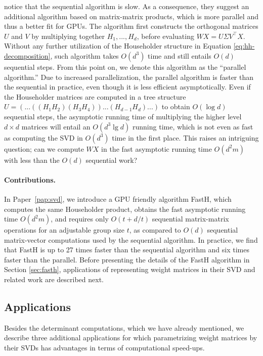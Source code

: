 \documentclass[11pt,a4paper,twoside,openright,final]{memoir}
\newcommand*{\paperref}[1]{Paper~\hyperref[#1]{\ref{#1}}}
\begin{document}
\citet{sequential} notice that the sequential algorithm is slow. 
As a consequence, they suggest an additional algorithm based on matrix-matrix products, which is more parallel and thus a better fit for GPUs. 
The algorithm first constructs the orthogonal matrices $U$ and $V$ by multiplying together $H_1, ..., H_d$, before evaluating $WX = U\Sigma V^\intercal X$.
Without any further utilization of the Householder structure in Equation \eqref{eq:hh-decomposition}, such algorithm takes $O(d^3)$ time and still entails $O(d)$ sequential steps.
From this point on, we denote this algorithm as the ``parallel algorithm.''
Due to increased parallelization, the parallel algorithm is faster than the sequential in practice, even though it is less efficient asymptotically.
Even if the Householder matrices are computed in a tree structure $U = (...((H_1H_2)(H_3H_4))...(H_{d-1}H_d)...)$ to obtain $O(\log d)$ sequential steps, the asymptotic running time of multiplying the higher level $d\times d$ matrices will entail an $O(d^3\lg d)$ running time, which is not even as fast as computing the SVD in $O(d^3)$ time in the first place.
This raises an intriguing question; can we compute $WX$ in the fast asymptotic running time $O(d^2m)$ with less than the $O(d)$ sequential work?  

\paragraph{Contributions.} In \paperref{pap:svd}, we introduce a GPU friendly algorithm FastH, which computes the same Householder product, obtains the fast asymptotic running time $O(d^2m)$, and requires only $O(t + d/t)$ sequential matrix-matrix operations for an adjustable group size $t$, as compared to $O(d)$ sequential matrix-vector computations used by the sequential algorithm.
In practice, we find that FastH is up to 27 times faster than the sequential algorithm and six times faster than the parallel. 
Before presenting the details of the FastH algorithm in Section \ref{sec:fasth}, applications of representing weight matrices in their SVD and related work are described next.

\subsection{Applications}\label{sec:fasth-applications}
Besides the determinant computations, which we have already mentioned, we describe three additional applications for which parametrizing weight matrices by their SVDs has advantages in terms of computational speed-ups.
\end{document}
